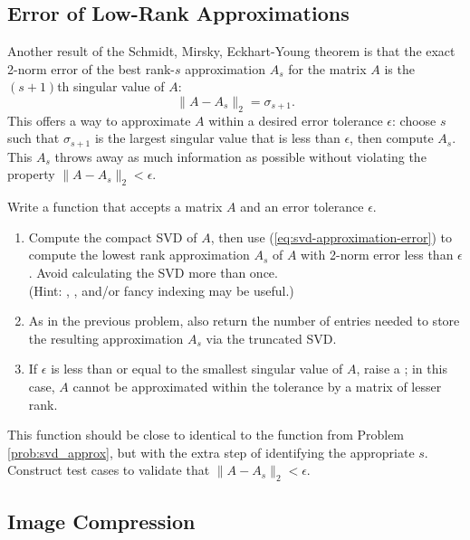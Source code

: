 \subsection*{Error of Low-Rank Approximations} %

Another result of the Schmidt, Mirsky, Eckhart-Young theorem is that the exact 2-norm error of the best rank-$s$ approximation $A_s$ for the matrix $A$ is the $(s+1)$th singular value of $A$:
\begin{equation}
\label{eq:svd-approximation-error}
\|A - A_s\|_2 = \sigma_{s+1}.
\end{equation}
%
This offers a way to approximate $A$ within a desired error tolerance $\epsilon$:
choose $s$ such that $\sigma_{s+1}$ is the largest singular value that is less than $\epsilon$, then compute $A_s$.
This $A_s$ throws away as much information as possible without violating the property $\|A - A_s\|_2 < \epsilon$.

\begin{problem} %
Write a function that accepts a matrix $A$ and an error tolerance $\epsilon$.
\begin{enumerate}
\item Compute the compact SVD of $A$, then use (\ref{eq:svd-approximation-error}) to compute the lowest rank approximation $A_s$ of $A$ with 2-norm error less than $\epsilon$.
Avoid calculating the SVD more than once.
\\ (Hint: , , and/or fancy indexing may be useful.)
\item As in the previous problem, also return the number of entries needed to store the resulting approximation $A_s$ via the truncated SVD.
\item If $\epsilon$ is less than or equal to the smallest singular value of $A$, raise a ; in this case, $A$ cannot be approximated within the tolerance by a matrix of lesser rank.
\end{enumerate}
This function should be close to identical to the function from Problem \ref{prob:svd_approx}, but with the extra step of identifying the appropriate $s$.
Construct test cases to validate that $\| A - A_s \|_2 < \epsilon$.
\end{problem}

\subsection*{Image Compression} %

